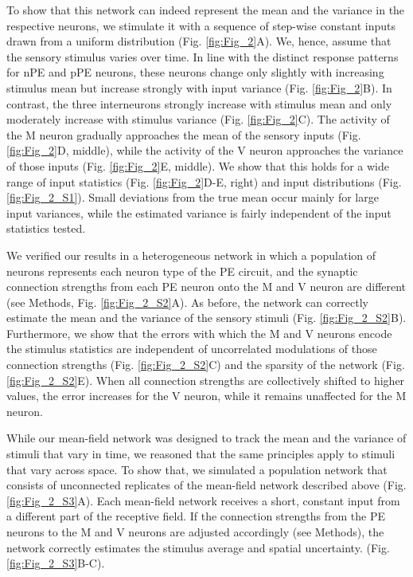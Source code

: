 \documentclass[10pt,a4paper,draft]{article}
\begin{document}
To show that this network can indeed represent the mean and the variance in the respective neurons, we stimulate it with a sequence of step-wise constant inputs drawn from a uniform distribution (Fig. \ref{fig:Fig_2}A). We, hence, assume that the sensory stimulus varies over time. In line with the distinct response patterns for nPE and pPE neurons, these neurons change only slightly with increasing stimulus mean but increase strongly with input variance (Fig. \ref{fig:Fig_2}B). In contrast, the three interneurons strongly increase with stimulus mean and only moderately increase with stimulus variance (Fig. \ref{fig:Fig_2}C). The activity of the M neuron gradually approaches the mean of the sensory inputs (Fig. \ref{fig:Fig_2}D, middle), while the activity of the V neuron approaches the variance of those inputs (Fig. \ref{fig:Fig_2}E, middle). We show that this holds for a wide range of input statistics (Fig. \ref{fig:Fig_2}D-E, right) and input distributions (Fig. \ref{fig:Fig_2_S1}). Small deviations from the true mean occur mainly for large input variances, while the estimated variance is fairly independent of the input statistics tested. 

We verified our results in a heterogeneous network in which a population of neurons represents each neuron type of the PE circuit, and the synaptic connection strengths from each PE neuron onto the M and V neuron are different (see Methods, Fig. \ref{fig:Fig_2_S2}A). As before, the network can correctly estimate the mean and the variance of the sensory stimuli (Fig. \ref{fig:Fig_2_S2}B). Furthermore, we show that the errors with which the M and V neurons encode the stimulus statistics are independent of uncorrelated modulations of those connection strengths (Fig. \ref{fig:Fig_2_S2}C) and the sparsity of the network (Fig. \ref{fig:Fig_2_S2}E). When all connection strengths are collectively shifted to higher values, the error increases for the V neuron, while it remains unaffected for the M neuron. 

While our mean-field network was designed to track the mean and the variance of stimuli that vary in time, we reasoned that the same principles apply to stimuli that vary across space. To show that, we simulated a population network that consists of unconnected replicates of the mean-field network described above (Fig. \ref{fig:Fig_2_S3}A). Each mean-field network receives a short, constant input from a different part of the receptive field. If the connection strengths from the PE neurons to the M and V neurons are adjusted accordingly (see Methods), the network correctly estimates the stimulus average and spatial uncertainty. (Fig. \ref{fig:Fig_2_S3}B-C).
\end{document}
